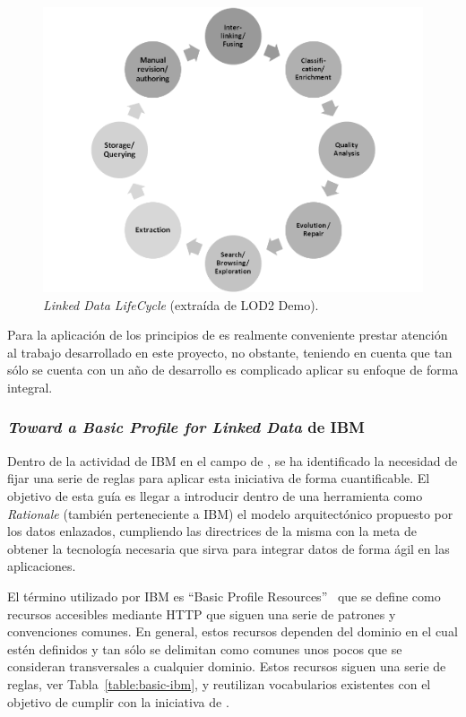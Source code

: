 \begin{figure}[!htb]
\centering
	\includegraphics[width=12cm]{images/phd/lod-lifecycle-small}
\caption{\textit{Linked Data LifeCycle} (extraída de LOD2 Demo).}
\label{fig:lod-lifecycle}
\end{figure}

Para la aplicación de los principios de \linkeddata es realmente conveniente prestar atención al trabajo
desarrollado en este proyecto, no obstante, teniendo en cuenta que tan sólo se cuenta con un año de desarrollo
es complicado aplicar su enfoque de forma integral.

\subsubsection{\textit{Toward a Basic Profile for Linked Data} de IBM}
Dentro de la actividad de IBM en el campo de \linkeddata, se ha identificado
la necesidad de fijar una serie de reglas para aplicar esta iniciativa de forma
cuantificable. El objetivo de esta guía es llegar a introducir dentro de una herramienta
como \textit{Rationale} (también perteneciente a IBM) el modelo arquitectónico propuesto por los datos
enlazados, cumpliendo las directrices de la misma con la meta de obtener
la tecnología necesaria que sirva para integrar datos de forma ágil en las aplicaciones.

El término utilizado por IBM es ``Basic Profile Resources''~\cite{basic-profile-ibm} que se define como recursos \linkeddata accesibles mediante HTTP que siguen una serie de patrones
y convenciones comunes. En general, estos recursos dependen del dominio en el cual
estén definidos y tan sólo se delimitan como comunes unos pocos que se consideran
transversales a cualquier dominio. Estos recursos siguen una serie de reglas, ver Tabla~\ref{table:basic-ibm}, y reutilizan
vocabularios existentes con el objetivo de cumplir con la iniciativa de \linkeddata. 

